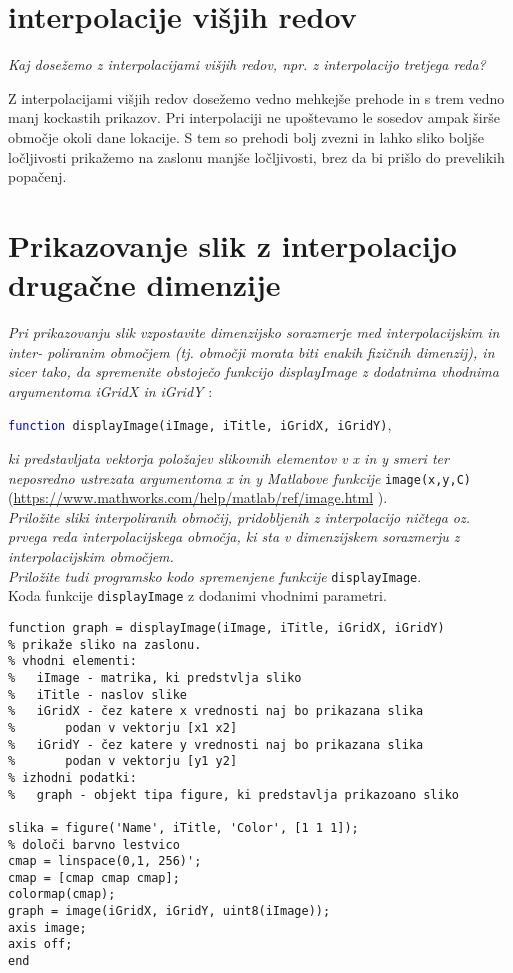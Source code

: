 \documentclass[12pt,a4paper]{article}
\begin{document}
\section{interpolacije višjih redov} 
\emph{Kaj dosežemo z interpolacijami višjih redov, npr. z interpolacijo tretjega reda?\\}

Z interpolacijami višjih redov dosežemo vedno mehkejše prehode in s trem vedno manj kockastih prikazov. Pri interpolaciji ne upoštevamo le sosedov ampak širše območje okoli dane lokacije. S tem so prehodi bolj zvezni in lahko sliko boljše ločljivosti prikažemo na zaslonu manjše ločljivosti, brez da bi prišlo do prevelikih popačenj. 
\section{Prikazovanje slik z interpolacijo drugačne dimenzije}
\emph{Pri prikazovanju slik vzpostavite dimenzijsko sorazmerje med interpolacijskim in inter-
poliranim območjem (tj. območji morata biti enakih fizičnih dimenzij), in sicer tako, da
spremenite obstoječo funkcijo displayImage z dodatnima vhodnima argumentoma iGridX
in iGridY} :\\
\begin{center}
\texttt{\textcolor{blue}{function} displayImage(iImage, iTitle, iGridX, iGridY)},
\end{center}
\emph{ki predstavljata vektorja položajev slikovnih elementov v x in y smeri ter
neposredno ustrezata argumentoma x in y Matlabove funkcije} \texttt{image(x,y,C)}\\
(\url{https://www.mathworks.com/help/matlab/ref/image.html} ).\\
\emph{Priložite sliki interpoliranih območij, pridobljenih z interpolacijo ničtega oz. prvega reda
interpolacijskega območja, ki sta v dimenzijskem sorazmerju z interpolacijskim območjem.\\
Priložite tudi programsko kodo spremenjene funkcije} \texttt{displayImage}.\\

Koda funkcije \texttt{displayImage} z dodanimi vhodnimi parametri.
\begin{verbatim}
function graph = displayImage(iImage, iTitle, iGridX, iGridY)
% prikaže sliko na zaslonu.
% vhodni elementi: 
%   iImage - matrika, ki predstvlja sliko
%   iTitle - naslov slike
%   iGridX - čez katere x vrednosti naj bo prikazana slika 
%       podan v vektorju [x1 x2] 
%   iGridY - čez katere y vrednosti naj bo prikazana slika
%       podan v vektorju [y1 y2]
% izhodni podatki:
%   graph - objekt tipa figure, ki predstavlja prikazoano sliko

slika = figure('Name', iTitle, 'Color', [1 1 1]);
% določi barvno lestvico
cmap = linspace(0,1, 256)';
cmap = [cmap cmap cmap];
colormap(cmap);
graph = image(iGridX, iGridY, uint8(iImage));
axis image;
axis off;
end
\end{verbatim}
\end{document}
